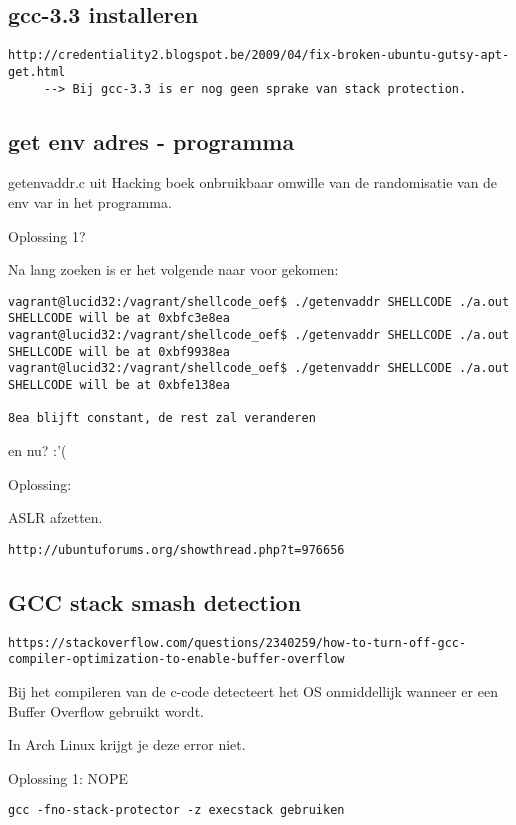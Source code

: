 \subsection{gcc-3.3 installeren}
\begin{lstlisting}
http://credentiality2.blogspot.be/2009/04/fix-broken-ubuntu-gutsy-apt-get.html
     --> Bij gcc-3.3 is er nog geen sprake van stack protection.
\end{lstlisting}

\subsection{get env adres - programma}
getenvaddr.c uit Hacking boek onbruikbaar omwille van de randomisatie van de env var in het programma.

Oplossing 1?

Na lang zoeken is er het volgende naar voor gekomen:
\begin{lstlisting}
vagrant@lucid32:/vagrant/shellcode_oef$ ./getenvaddr SHELLCODE ./a.out 
SHELLCODE will be at 0xbfc3e8ea
vagrant@lucid32:/vagrant/shellcode_oef$ ./getenvaddr SHELLCODE ./a.out 
SHELLCODE will be at 0xbf9938ea
vagrant@lucid32:/vagrant/shellcode_oef$ ./getenvaddr SHELLCODE ./a.out 
SHELLCODE will be at 0xbfe138ea

8ea blijft constant, de rest zal veranderen
\end{lstlisting}

en nu? :'(

Oplossing:

ASLR afzetten.

\begin{lstlisting}
http://ubuntuforums.org/showthread.php?t=976656
\end{lstlisting}


\subsection{GCC stack smash detection}
\begin{lstlisting}
https://stackoverflow.com/questions/2340259/how-to-turn-off-gcc-compiler-optimization-to-enable-buffer-overflow
\end{lstlisting}

Bij het compileren van de c-code detecteert het OS onmiddellijk wanneer er een Buffer Overflow gebruikt wordt.

In Arch Linux krijgt je deze error niet.

Oplossing 1: NOPE
\begin{lstlisting}
gcc -fno-stack-protector -z execstack gebruiken
\end{lstlisting}

